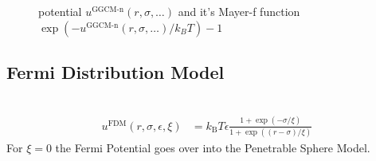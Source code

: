 \begin{figure}[htb]
\centering
  \quad
  \caption{potential $u^\text{GGCM-n}(r,\sigma,\ldots)$ and it's Mayer-f function $\exp(-u^\text{GGCM-n}(r,\sigma,\ldots)/k_BT)-1$}
\end{figure}


\newpage
\subsection{Fermi Distribution Model}
~\\
\begin{align}
u^\text{FDM}(r,\sigma,\epsilon,\xi) &=
k_\text{B} T \epsilon
\frac{1+\exp\left(-\sigma/\xi\right)}{1+\exp\left(\left(r-\sigma\right)/\xi\right)}
\end{align}
For $\xi = 0$ the Fermi Potential goes over into the Penetrable Sphere Model.

